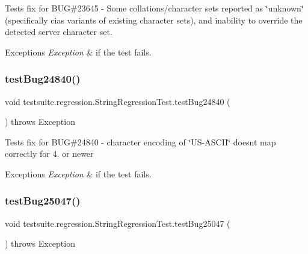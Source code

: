 Tests fix for B\+UG\#23645 -\/ Some collations/character sets reported as \char`\"{}unknown\char`\"{} (specifically cias variants of existing character sets), and inability to override the detected server character set.


\begin{DoxyExceptions}{Exceptions}
{\em Exception} & if the test fails. \\
\hline
\end{DoxyExceptions}
\mbox{\label{classtestsuite_1_1regression_1_1_string_regression_test_a64fc08a013f1e23f5fcaaeecb3681aa5}} 
\subsubsection{\texorpdfstring{test\+Bug24840()}{testBug24840()}}
{\footnotesize\ttfamily void testsuite.\+regression.\+String\+Regression\+Test.\+test\+Bug24840 (\begin{DoxyParamCaption}{ }\end{DoxyParamCaption}) throws Exception}

Tests fix for B\+UG\#24840 -\/ character encoding of \char`\"{}\+U\+S-\/\+A\+S\+C\+I\+I\char`\"{} doesn\textquotesingle{}t map correctly for 4. or newer


\begin{DoxyExceptions}{Exceptions}
{\em Exception} & if the test fails. \\
\hline
\end{DoxyExceptions}
\mbox{\label{classtestsuite_1_1regression_1_1_string_regression_test_a310d7878e44bc9bf13daa040be2bb847}} 
\subsubsection{\texorpdfstring{test\+Bug25047()}{testBug25047()}}
{\footnotesize\ttfamily void testsuite.\+regression.\+String\+Regression\+Test.\+test\+Bug25047 (\begin{DoxyParamCaption}{ }\end{DoxyParamCaption}) throws Exception}

